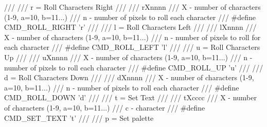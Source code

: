 \documentclass{article}
\begin{document}
///
/// \brief r = Roll Characters Right
/// 
/// \example rXnnnn
/// \param X - {number of characters (1-9, a=10, b=11...)}
/// \param n - number of pixels to roll each character
///
#define CMD_ROLL_RIGHT 'r'
///
/// \brief l = Roll Characters Left
/// 
/// \example lXnnnn
/// \param X - {number of characters (1-9, a=10, b=11...)}
/// \param n - number of pixels to roll for each character
///
#define CMD_ROLL_LEFT 'l'
///
/// \brief u = Roll Characters Up
/// 
/// \example uXnnnn
/// \param X - {number of characters (1-9, a=10, b=11...)}
/// \param n - number of pixels to roll each character
///
#define CMD_ROLL_UP 'u'
///
/// \brief d = Roll Characters Down
/// 
/// \example dXnnnn
/// \param X - {number of characters (1-9, a=10, b=11...)}
/// \param n - number of pixels to roll each character
///
#define CMD_ROLL_DOWN 'd'
///
/// \brief t = Set Text
/// 
/// \example tXcccc
/// \param X - {number of characters (1-9, a=10, b=11...)}
/// \param c - character
///
#define CMD_SET_TEXT 't'
///
/// \brief p = Set palette
\end{document}
